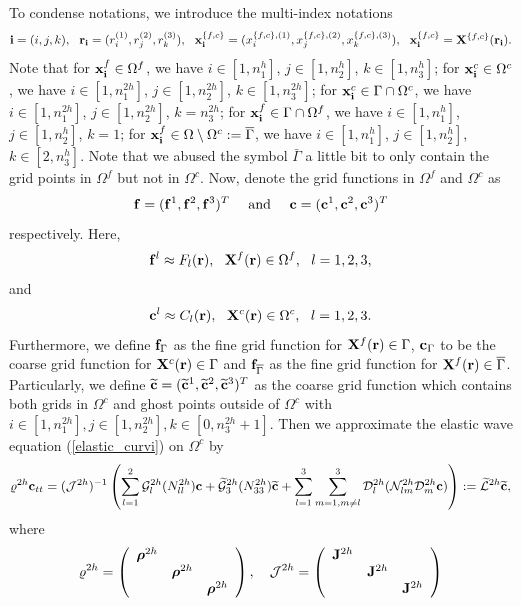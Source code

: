  To condense notations, we introduce the multi-index notations
\[{\bf i} = (i,j,k),\ \ {\bf r}_{\bf i} = (r^{(1)}_i,r^{(2)}_j,r^{(3)}_k),\ \ {\bf x}^{\{f,c\}}_{\bf i} = (x^{\{f,c\},(1)}_i,x^{\{f,c\},(2)}_j,x^{\{f,c\},(3)}_k),\ \ {\bf x}_{\bf i}^{\{f,c\}} = {\bf X}^{\{f,c\}}({\bf r}_{\bf i}).\]
Note that for ${\bf x}^f_{\bf i}\in\Omega^f$, we have $i\in[1,n_1^h]$, $j\in[1,n_2^h]$, $k\in[1,n_3^h]$; for ${\bf x}^c_{\bf i}\in\Omega^c$, we have $i\in[1,n_1^{2h}]$, $j\in[1,n_2^{2h}]$, $k\in[1,n_3^{2h}]$; for ${\bf x}_{\bf i}^c \in \Gamma\cap\Omega^c$, we have $i\in[1,n_1^{2h}]$, $j\in[1,n_2^{2h}]$, $k = n_3^{2h}$; for ${\bf x}_{\bf i}^f \in \Gamma\cap\Omega^f$, we have $i\in[1,n_1^h]$, $j\in[1,n_2^h]$, $k = 1$; for ${\bf x}_{\bf i}^f\in \Omega \setminus \Omega^c := \overline{\Gamma}$, we have $i\in[1,n_1^h]$, $j\in[1,n_2^h]$, $k\in[2,n_3^h]$. Note that we abused the symbol $\bar{\Gamma}$ a little bit to only contain the grid points in $\Omega^f$ but not in $\Omega^c$. Now, denote the grid functions in $\Omega^f$ and $\Omega^c$ as
\[{\bf f} = ({\bf f}^1, {\bf f}^2, {\bf f}^3)^T\ \ \ \ \mbox{and}\ \ \ \  {\bf c} = ({\bf c}^1, {\bf c}^2, {\bf c}^3)^T\]
respectively. Here, 
\[{\bf f}^l\approx F_l({\bf r}), \ \ {\bf X}^f({\bf r})\in\Omega^f,\ \ l=1,2,3 ,\]
and
\[{\bf c}^l \approx C_l({\bf r}),\ \ {\bf X}^c({\bf r})\in\Omega^c, \ \ l = 1,2,3.\]
Furthermore, we define ${\bf f}_{\Gamma}$ as the fine grid function for ${\bf X}^f({{\bf r}})\in\Gamma$, ${\bf c}_{\Gamma}$ to be the coarse grid function for ${\bf X}^c({{\bf r}})\in\Gamma$ and ${\bf f}_{\overline{\Gamma}}$ as the fine grid function for ${\bf X}^f({{\bf r}})\in\overline{\Gamma}$. Particularly, we define $\widetilde{\bf c} = (\widetilde{\bf c}^1,\widetilde{\bf c}^2,\widetilde{\bf c}^3)^T$ as the coarse grid function which contains both grids in $\Omega^c$ and ghost points outside of $\Omega^c$ with $i\in[1,n_1^{2h}], j\in[1,n_2^{2h}], k\in[0,n_3^{2h}+1]$. Then we approximate the elastic wave equation (\ref{elastic_curvi}) on $\Omega^c$ by
\begin{equation}\label{elastic_semi_c}
{\varrho}^{2h} {\bf c}_{tt} =( \mathcal{ J}^{2h})^{-1}\left(\sum_{l=1}^2\mathcal{G}_l^{2h}({N}_{ll}^{2h}){\bf c}+\wt{\mathcal{G}}_3^{2h}({N}_{33}^{2h}){\wt{\bf c}}+\sum_{l=1}^3\sum_{m=1,m\neq l}^3\mathcal{D}_l^{2h}(\mathcal{N}_{lm}^{2h}\mathcal{D}_m^{2h}{\bf c})\right) := \wt{\mathcal{L}}^{2h} {\wt {\bf c}},
\end{equation}
where 
\begin{align}\label{rho_j}
\varrho^{2h} = \left(\begin{array}{ccc}
{\bm \rho}^{2h}& ~  & ~ \\
~ & {\bm \rho}^{2h} & ~ \\
~ &~  &{\bm \rho}^{2h}\end{array}\right),\ \ \ \mathcal{J}^{2h} = \left(\begin{array}{ccc}
{\bf J}^{2h}& ~  & ~ \\
~ & {\bf J}^{2h} & ~ \\
~ &~  &{\bf J}^{2h}\end{array}\right)
\end{align}
